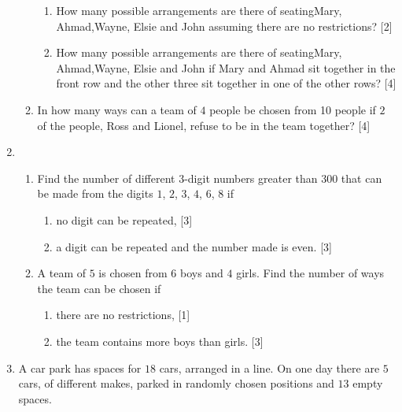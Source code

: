 \begin{enumerate}
\begin{enumerate}[label=(\roman*)]
	\begin{enumerate}[label=(\alph*)]
		\item How many possible arrangements are there of seatingMary, Ahmad,Wayne, Elsie and John
		assuming there are no restrictions? \hfill[2]
		\item How many possible arrangements are there of seatingMary, Ahmad,Wayne, Elsie and John
		if Mary and Ahmad sit together in the front row and the other three sit together in one of
		the other rows? \hfill[4]
	\end{enumerate}
\item  In how many ways can a team of $4$ people be chosen from 10 people if $2$ of the people, Ross and Lionel, refuse to be in the team together? \hfill [4]
\end{enumerate}




\item  \begin{enumerate}[label=(\roman*)]
	\item Find the number of different $3$-digit numbers greater than 300 that can be made from the digits $1$, $2$, $3$, $4$, $6$, $8$ if
\begin{enumerate}[label=(\alph*)]
	\item no digit can be repeated, \hfill[3]
	\item a digit can be repeated and the number made is even. \hfill[3]
\end{enumerate}
\item  A team of $5$ is chosen from $6$ boys and $4$ girls. Find the number of ways the team can be chosen if 
\begin{enumerate}[label=(\alph*)]
	\item there are no restrictions, \hfill[1]
	\item the team contains more boys than girls. \hfill[3]
\end{enumerate}
\end{enumerate}





\item  A car park has spaces for $18$ cars, arranged in a line. On one day there are $5$ cars, of different makes, parked in randomly chosen positions and $13$ empty spaces.


\end{enumerate}
